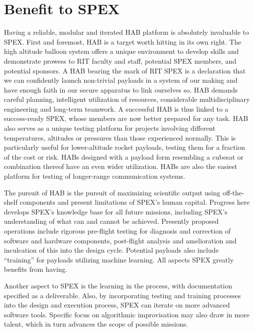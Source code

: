 \documentclass[conference]{IEEEtran} %
\begin{document}
\section{Benefit to SPEX}
Having a reliable, modular and iterated HAB platform is absolutely invaluable to SPEX. First and foremost, HAB is a target worth hitting in its own right. The high altitude balloon system offers a unique environment to develop skills and demonstrate prowess to RIT faculty and staff, potential SPEX members, and potential sponsors. A HAB bearing the mark of RIT SPEX is a declaration that we can confidently launch non-trivial payloads in a system of our making and have enough faith in our secure apparatus to link ourselves so. HAB demands careful planning, intelligent utilization of resources, considerable multidisciplinary engineering and long-term teamwork. A successful HAB is thus linked to a success-ready SPEX, whose members are now better prepared for any task. HAB also serves as a unique testing platform for projects involving different temperatures, altitudes or pressures than those experienced normally. This is particularly useful for lower-altitude rocket payloads, testing them for a fraction of the cost or risk. HABs designed with a payload form resembling a cubesat or combination thereof have an even wider utilization. HABs are also the easiest platform for testing of longer-range communication systems.

The pursuit of HAB is the pursuit of maximizing scientific output using off-the-shelf components and present limitations of SPEX’s human capital. Progress here develops SPEX’s knowledge base for all future missions, including SPEX’s understanding of what can and cannot be achieved. Presently proposed operations include rigorous pre-flight testing for diagnosis and correction of software and hardware components, post-flight analysis and amelioration and inculcation of this into the design cycle. Potential payloads also include “training” for payloads utilizing machine learning. All aspects SPEX greatly benefits from having.

Another aspect to SPEX is the learning in the process, with documentation specified as a deliverable. Also, by incorporating testing and training processes into the design and execution process, SPEX can iterate on more advanced software tools. Specific focus on algorithmic improvisation may also draw in more talent, which in turn advances the scope of possible missions.
\end{document}
